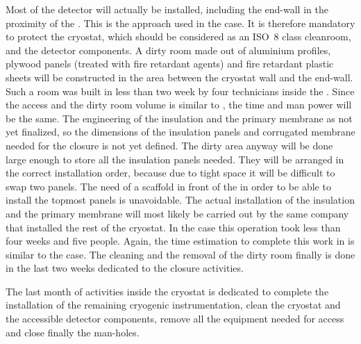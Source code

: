 Most of the detector will actually be installed, including the  end-wall in the proximity of the .
This is the approach used in the  case.
It is therefore mandatory to protect the cryostat, which should be considered as an ISO~8 class cleanroom, and the detector components.
A dirty room made out of aluminium profiles, plywood panels (treated with fire retardant agents) and fire retardant plastic sheets will be constructed in the area between the cryostat wall and the  end-wall.
Such a room was built in less than two week by four technicians inside the .
Since the access and the dirty room volume is similar to , the time and man power will be the same.
The engineering of the insulation and the primary membrane as not yet finalized, so the dimensions of the insulation panels and corrugated membrane needed for the  closure is not yet defined.
The dirty area anyway will be done large enough to store all the insulation panels needed.
They will be arranged in the correct installation order, because due to tight space it will be difficult to swap two panels.
The need of a scaffold in front of the  in order to be able to install the topmost panels is unavoidable.
The actual installation of the insulation and the primary membrane will most likely be carried out by the same company that installed the rest of the cryostat.
In the  case this operation took less than four weeks and five people.
Again, the time estimation to complete this work in  is similar to the  case.
The cleaning and the removal of the dirty room finally is done in the last two weeks dedicated to the  closure activities.

The last month of activities inside the cryostat is dedicated to complete the installation of the remaining cryogenic instrumentation, clean the cryostat and the accessible detector components, remove all the equipment needed for access and close finally the man-holes.

